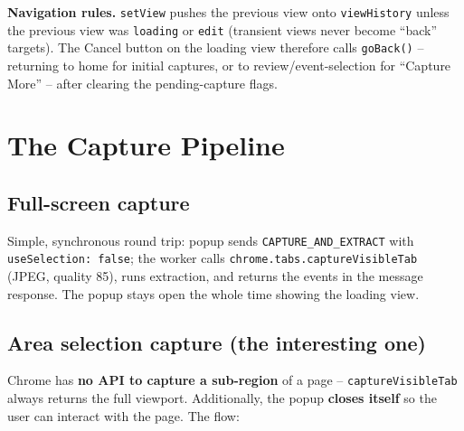 \documentclass[11pt]{article}
\begin{document}
\textbf{Navigation rules.} \texttt{setView} pushes the previous view onto
\texttt{viewHistory} unless the previous view was \texttt{loading} or
\texttt{edit} (transient views never become ``back'' targets). The Cancel
button on the loading view therefore calls \texttt{goBack()} -- returning to
home for initial captures, or to review/event-selection for ``Capture More''
-- after clearing the pending-capture flags.

\section{The Capture Pipeline}

\subsection{Full-screen capture}

Simple, synchronous round trip: popup sends \texttt{CAPTURE\_AND\_EXTRACT}
with \texttt{useSelection: false}; the worker calls
\texttt{chrome.tabs.captureVisibleTab} (JPEG, quality 85), runs extraction,
and returns the events in the message response. The popup stays open the
whole time showing the loading view.

\subsection{Area selection capture (the interesting one)}

Chrome has \textbf{no API to capture a sub-region} of a page --
\texttt{captureVisibleTab} always returns the full viewport. Additionally,
the popup \textbf{closes itself} so the user can interact with the page. The
flow:
\end{document}
